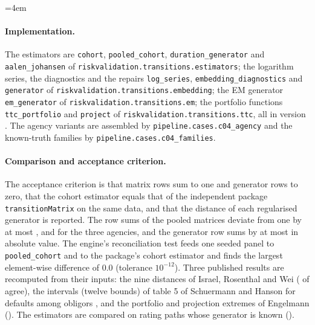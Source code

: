 {\emergencystretch=4em \paragraph{Implementation.} The estimators are \texttt{cohort}, \texttt{pooled\_\allowbreak{}cohort}, \texttt{duration\_\allowbreak{}generator} and \texttt{aalen\_\allowbreak{}johansen} of \texttt{riskvalidation.\allowbreak{}transitions.\allowbreak{}estimators}; the logarithm series, the diagnostics and the repairs \texttt{log\_\allowbreak{}series}, \texttt{embedding\_\allowbreak{}diagnostics} and \texttt{generator} of \texttt{riskvalidation.\allowbreak{}transitions.\allowbreak{}embedding}; the EM generator \texttt{em\_\allowbreak{}generator} of \texttt{riskvalidation.\allowbreak{}transitions.\allowbreak{}em}; the portfolio functions \texttt{ttc\_\allowbreak{}portfolio} and \texttt{project} of \texttt{riskvalidation.\allowbreak{}transitions.\allowbreak{}ttc}, all in version \rtgRvVersion{}. The agency variants are assembled by \texttt{pipeline.\allowbreak{}cases.\allowbreak{}c04\_\allowbreak{}agency} and the known-truth families by \texttt{pipeline.\allowbreak{}cases.\allowbreak{}c04\_\allowbreak{}families}.\par}

\paragraph{Comparison and acceptance criterion.} The acceptance criterion is that matrix rows sum to one and generator rows to zero, that the cohort estimator equals that of the independent package \texttt{transitionMatrix} on the same data, and that the distance of each regularised generator is reported. The row sums of the pooled matrices deviate from one by at most \rtgRowsumSp{}, \rtgRowsumMoodys{} and \rtgRowsumFitch{} for the three agencies, and the generator row sums by at most \rtgGenrowSpWeighted{} in absolute value. The engine's reconciliation test feeds one seeded panel to \texttt{pooled\_\allowbreak{}cohort} and to the package's cohort estimator \citep{ratings:transitionmatrix} and finds the largest element-wise difference of 0.0 (tolerance $10^{-12}$). Three published results are recomputed from their inputs: the nine distances of Israel, Rosenthal and Wei (\rtgIrwAgree{} of \rtgIrwTotal{} agree), the \rtgSrTotal{} intervals (twelve bounds) of table 5 of Schuermann and Hanson for \rtgSrDefaults{} defaults among \rtgSrN{} obligors \citep{ratings:schuermann2004}, and the portfolio and projection extremes of Engelmann (). The estimators are compared on rating paths whose generator is known ().

